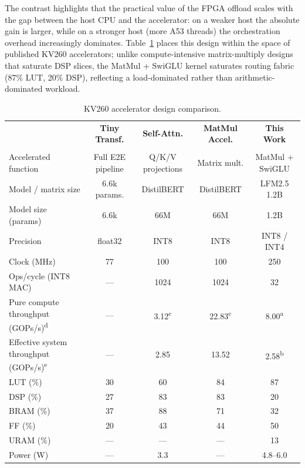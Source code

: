 \documentclass[manuscript,]{acmart} %
\begin{document}
The contrast highlights that the practical value of the FPGA offload scales with
the gap between the host CPU and the accelerator: on a weaker host the absolute
gain is larger, while on a stronger host (more A53 threads) the orchestration
overhead increasingly dominates.
Table~\ref{tab:kv260_comparison} places this design within the space of published KV260 accelerators; unlike compute-intensive matrix-multiply designs that saturate DSP slices, the MatMul + SwiGLU kernel saturates routing fabric (87\% LUT, 20\% DSP), reflecting a load-dominated rather than arithmetic-dominated workload.

\begin{table}[H]
\centering
\caption{KV260 accelerator design comparison.}
\label{tab:kv260_comparison}
\setlength{\tabcolsep}{2.5pt}
\footnotesize
\begin{tabular}{l c c c c}
\hline
 & \textbf{Tiny Transf.} & \textbf{Self-Attn.} & \textbf{MatMul Accel.} & \textbf{This Work} \\
 & \cite{11310944tin} & \cite{li2025fpgabasedhardware} & \cite{11311069} & \\
\hline
Accelerated function & Full E2E pipeline & Q/K/V projections & Matrix mult. & MatMul + SwiGLU \\
Model / matrix size & 6.6k params. & DistilBERT & DistilBERT & LFM2.5 1.2B \\
Model size (params)  & 6.6k & 66M & 66M & 1.2B \\
Precision & float32 & INT8 & INT8 & INT8 / INT4 \\
Clock (MHz) & 77 & 100 & 100 & 250 \\
\hline
Ops/cycle (INT8 MAC) & --- & 1024 & 1024 & 32 \\
Pure compute throughput (GOPs/s)\textsuperscript{d}      & --- & 3.12\textsuperscript{c} & 22.83\textsuperscript{c} & 8.00\textsuperscript{a} \\
Effective system throughput (GOPs/s)\textsuperscript{e} & --- & 2.85 & 13.52 & 2.58\textsuperscript{b} \\
\hline
LUT (\%)          & 30 & 60 & 84 & 87 \\
DSP (\%)          & 27 & 83 & 83 & 20 \\
BRAM (\%)         & 37 & 88 & 71 & 32 \\
FF (\%)           & 20 & 43 & 44 & 50 \\
URAM (\%)         & --- & --- & --- & 13 \\
\hline
Power (W)         & --- & 3.3 & --- & 4.8--6.0 \\
\hline
\end{tabular}


\end{table}
\end{document}
